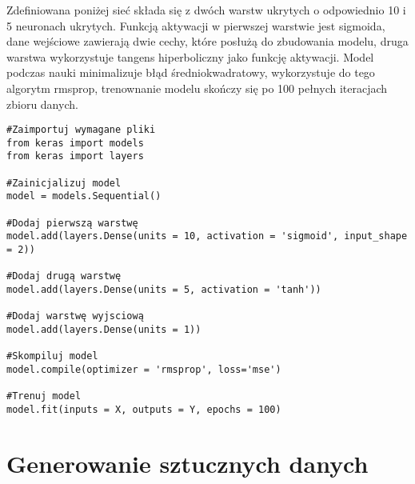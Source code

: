 \documentclass[11pt]{book}
\theoremstyle{definition}
\begin{document}
Zdefiniowana poniżej sieć składa się z dwóch warstw ukrytych o odpowiednio 10 i 5 neuronach ukrytych. Funkcją aktywacji w pierwszej warstwie jest sigmoida, dane wejściowe zawierają dwie cechy, które posłużą do zbudowania modelu, druga warstwa wykorzystuje tangens hiperboliczny jako funkcję aktywacji. Model podczas nauki minimalizuje błąd średniokwadratowy, wykorzystuje do tego algorytm rmsprop, trenownanie modelu skończy się po 100 pełnych iteracjach zbioru danych.


\begin{lstlisting}
#Zaimportuj wymagane pliki
from keras import models
from keras import layers

#Zainicjalizuj model
model = models.Sequential()

#Dodaj pierwszą warstwę
model.add(layers.Dense(units = 10, activation = 'sigmoid', input_shape = 2))

#Dodaj drugą warstwę
model.add(layers.Dense(units = 5, activation = 'tanh'))

#Dodaj warstwę wyjsciową
model.add(layers.Dense(units = 1))

#Skompiluj model
model.compile(optimizer = 'rmsprop', loss='mse')

#Trenuj model
model.fit(inputs = X, outputs = Y, epochs = 100)
\end{lstlisting}




\section{Generowanie sztucznych danych}
\end{document}

